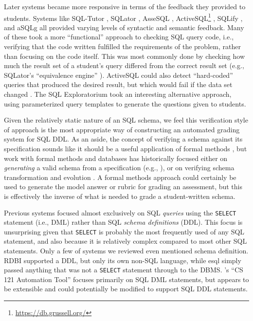 \documentclass[sigconf, authordraft, capitalise]{acmart}
\begin{document}
Later systems became more responsive in terms of the feedback they provided to students. Systems like SQL-Tutor \cite{Mitrovic.A-1998a-Learning}, SQLator \cite{Sadiq.S-2004a-SQLator}, AsseSQL \cite{Prior.J-2004a-Backwash}, ActiveSQL\footnote{\url{https://db.grussell.org/}} \cite{Russell.G-2004a-Improving,Russell.G-2005a-Online}, SQLify \cite{Dekeyser.S-2007a-Computer}, and aSQLg \cite{Kleiner.C-2013a-Automated} all provided varying levels of syntactic and semantic feedback. Many of these took a more ``functional'' approach to checking SQL query code, i.e., verifying that the code written fulfilled the requirements of the problem, rather than focusing on the code itself. This was most commonly done by checking how much the result set of a student's query differed from the correct result set (e.g., SQLator's ``equivalence engine'' \cite{Sadiq.S-2004a-SQLator}). ActiveSQL could also detect ``hard-coded'' queries that produced the desired result, but which would fail if the data set changed \cite{Russell.G-2005a-Online}. The SQL Exploratorium \cite{Brusilovsky.P-2010a-Learning} took an interesting alternative approach, using parameterized query templates to generate the questions given to students.

Given the relatively static nature of an SQL schema, we feel this verification style of approach is the most appropriate way of constructing an automated grading system for SQL DDL. As an aside, the concept of verifying a schema against its specification sounds like it should be a useful application of formal methods \cite{Spivey.J-1989a-An-introduction}, but work with formal methods and databases has historically focused either on \emph{generating} a valid schema from a specification (e.g., \cite{Vatanawood.W-2004a-Formal,Lukovic.I-2003a-Proceedings,Choppella.V-2006a-Constructing}), or on verifying schema transformation and evolution \cite{Bench-Capon.T-1998a-Report}. A formal methods approach could certainly be used to generate the model answer or rubric for grading an assessment, but this is effectively the inverse of what is needed to grade a student-written schema.

Previous systems focused almost exclusively on SQL \emph{queries} using the \texttt{SELECT} statement (i.e., DML) rather than SQL \emph{schema definitions} (DDL). This focus is unsurprising given that \texttt{SELECT} is probably the most frequently used of any SQL statement, and also because it is relatively complex compared to most other SQL statements. Only a few of systems we reviewed even mentioned schema definition. RDBI \cite{Dietrich.S-1993a-An-educational} supported a DDL, but only its own non-SQL language, while esql \cite{Kearns.R-1997a-A-teaching} simply passed anything that was not a \texttt{SELECT} statement through to the DBMS. \citeauthor{Gong.A-2015a-CS-121-Automation}'s ``CS 121 Automation Tool'' \cite{Gong.A-2015a-CS-121-Automation} focuses primarily on SQL DML statements, but appears to be extensible and could potentially be modified to support SQL DDL statements.
\end{document}
